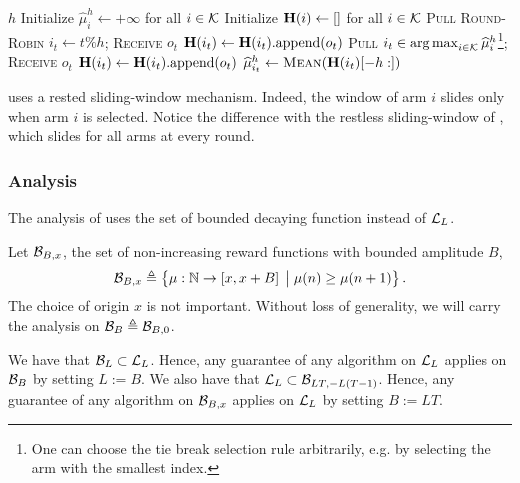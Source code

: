\begin{minipage}{\textwidth}
\renewcommand*\footnoterule{}
\begin{savenotes}
\begin{algorithm}[H]
\caption{\SWA \citep{levine2017rotting} }
\label{alg:SWA}
\begin{algorithmic}[1]
\Require $h$
\State Initialize $\hat{\mu}_{i}^h \leftarrow + \infty$ for all $i \in \mathcal{K}$
\State Initialize $\mathbf{H}(i) \leftarrow []$ for all $i \in \mathcal{K}$
	 	\State \textsc{Pull Round-Robin}  $i_t \gets t \% h $; \textsc{Receive} $o_{t}$
	 	\State $\mathbf{H}(i_t) \leftarrow \mathbf{H}(i_t)\text{.append}(o_{t})$
	\EndFor
		\State \textsc{Pull}  $i_t \in \operatorname*{arg\,max}_{i \in \mathcal{K}} \widehat{\mu}_{i}^h$\footnote{One can choose the tie break selection rule arbitrarily, e.g. by selecting the arm with the smallest index.}; \textsc{Receive} $o_{t}$
		\State $\mathbf{H}(i_t) \leftarrow \mathbf{H}(i_t)\text{.append}(o_{t})$
		\State $\widehat{\mu}_{i_t}^h \leftarrow \textsc{Mean}(\mathbf{H}(i_t)[-h:])$
		\EndIf
	\EndFor
\end{algorithmic}
\end{algorithm}
\end{savenotes}
\end{minipage}
\begin{remark}
\SWA uses a rested sliding-window mechanism. Indeed, the window of arm $i$ slides only when arm $i$ is selected. Notice the difference with the restless sliding-window of \SWUCB \citep{garivier2011upper-confidence-bound}, which slides for all arms at every round.
\end{remark}
%
\subsubsection*{Analysis}

The analysis of \citet{levine2017rotting} uses the set of bounded decaying function instead of $\mathcal{L}_L$. 

\begin{definition}\label{def:rew-bounded} 
Let $\mathcal{B}_{B,x}$, the set of non-increasing reward functions with bounded amplitude $B$,
\[ 
\mathcal{B}_{B,x} \triangleq \left\{ \mu : {\mathbb N} \rightarrow \left[x , x +B\right] \;\big{|}\; \mu(n) \geq \mu(n+1)  \right\}.
\]
The choice of origin $x$ is not important. Without loss of generality, we will carry the analysis on $\mathcal{B}_{B} \triangleq \mathcal{B}_{B,0}$. 
\end{definition}
\begin{remark}
\label{rem:BBvsLL}
We have that $\mathcal{B}_L \subset \mathcal{L}_L$. Hence, any guarantee of any algorithm on $\mathcal{L}_L$ applies on $\mathcal{B}_{B}$ by setting $L := B$. We also have that $\mathcal{L}_L \subset \mathcal{B}_{LT, -L\left(T-1\right)}$. Hence, any guarantee of any algorithm on $\mathcal{B}_{B,x}$ applies on $\mathcal{L}_L$ by setting $B := LT$.
\end{remark}

